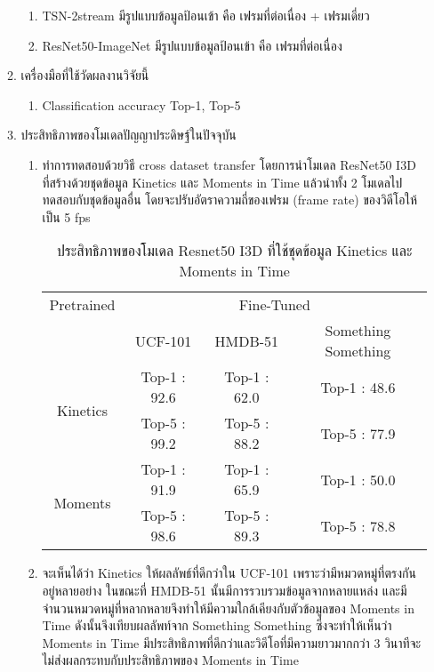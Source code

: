 \begin{enumerate}
\begin{enumerate}
\begin{enumerate}
				\item TSN-2stream มีรูปแบบข้อมูลป้อนเข้า คือ เฟรมที่ต่อเนื่อง + เฟรมเดี่ยว
				\item ResNet50-ImageNet	มีรูปแบบข้อมูลป้อนเข้า คือ เฟรมที่ต่อเนื่อง
			\end{enumerate}
		\item เครื่องมือที่ใช้วัดผลงานวิจัยนี้
			\begin{enumerate}
				\item Classification accuracy Top-1, Top-5
			\end{enumerate}
		\item ประสิทธิภาพของโมเดลปัญญาประดิษฐ์ในปัจจุบัน
			\begin{enumerate}
				\item ทำการทดสอบด้วยวิธี cross dataset transfer โดยการนำโมเดล ResNet50 I3D ที่สร้างด้วยชุดข้อมูล Kinetics และ Moments in Time 
				แล้วนำทั้ง 2 โมเดลไปทดสอบกับชุดข้อมูลอื่น โดยจะปรับอัตราความถี่ของเฟรม (frame rate) ของวิดีโอให้เป็น 5 fps
				\begin{table}[!ht]
					\centering
					\begin{tabular}{|c|c|c|c|}
						\hline
						{Pretrained}&\multicolumn{3}{c|}{Fine-Tuned}\\
						\cline{2-4}
						{}								& UCF-101			& HMDB-51			& Something Something			\\
						\hline
						\multirow{2}{*}{Kinetics}		& Top-1 : 92.6		& Top-1 : 62.0		& Top-1 : 48.6		\\
						{}								& Top-5 : 99.2		& Top-5 : 88.2		& Top-5 : 77.9		\\
						\hline
						\multirow{2}{*}{Moments}		& Top-1 : 91.9		& Top-1 : 65.9		& Top-1 : 50.0		\\
						{}								& Top-5 : 98.6		& Top-5 : 89.3		& Top-5 : 78.8		\\
						\hline
					\end{tabular}
					\caption{ประสิทธิภาพของโมเดล Resnet50 I3D ที่ใช้ชุดข้อมูล Kinetics และ Moments in Time}
					\label{tab: Data transfer performance ของโมเดล Resnet50 I3D}
				\end{table}
				\item จะเห็นได้ว่า Kinetics ให้ผลลัพธ์ที่ดีกว่าใน UCF-101 เพราะว่ามีหมวดหมู่ที่ตรงกันอยู่หลายอย่าง ในขณะที่ HMDB-51 นั้นมีการรวบรวมข้อมูลจากหลายแหล่ง 
				และมีจำนวนหมวดหมู่ที่หลากหลายจึงทำให้มีความใกล้เคียงกับตัวข้อมูลของ Moments in Time ดังนั้นจึงเทียบผลลัพท์จาก Something Something 
				ซึ่งจะทำให้เห็นว่า Moments in Time มีประสิทธิภาพที่ดีกว่าและวิดีโอที่มีความยาวมากกว่า 3 วินาทีจะไม่ส่งผลกระทบกับประสิทธิภาพของ Moments in Time

\end{enumerate}
\end{enumerate}
\end{enumerate}
